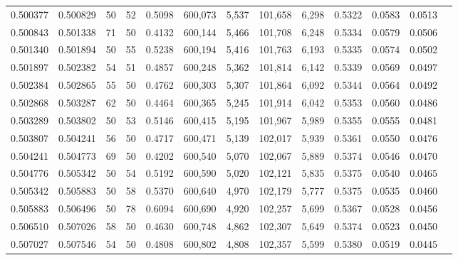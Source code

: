 \begin{tabular}{rrrrrrrrrrrrr}
0.500377 & 0.500829 &    50 &  52 &                                     0.5098 & 600,073 &   5,537 & 101,658 &   6,298 & 0.5322 & 0.0583 & 0.0513 \\
0.500843 & 0.501338 &    71 &  50 &                                     0.4132 & 600,144 &   5,466 & 101,708 &   6,248 & 0.5334 & 0.0579 & 0.0506 \\
0.501340 & 0.501894 &    50 &  55 &                                     0.5238 & 600,194 &   5,416 & 101,763 &   6,193 & 0.5335 & 0.0574 & 0.0502 \\
0.501897 & 0.502382 &    54 &  51 &                                     0.4857 & 600,248 &   5,362 & 101,814 &   6,142 & 0.5339 & 0.0569 & 0.0497 \\
0.502384 & 0.502865 &    55 &  50 &                                     0.4762 & 600,303 &   5,307 & 101,864 &   6,092 & 0.5344 & 0.0564 & 0.0492 \\
0.502868 & 0.503287 &    62 &  50 &                                     0.4464 & 600,365 &   5,245 & 101,914 &   6,042 & 0.5353 & 0.0560 & 0.0486 \\
0.503289 & 0.503802 &    50 &  53 &                                     0.5146 & 600,415 &   5,195 & 101,967 &   5,989 & 0.5355 & 0.0555 & 0.0481 \\
0.503807 & 0.504241 &    56 &  50 &                                     0.4717 & 600,471 &   5,139 & 102,017 &   5,939 & 0.5361 & 0.0550 & 0.0476 \\
0.504241 & 0.504773 &    69 &  50 &                                     0.4202 & 600,540 &   5,070 & 102,067 &   5,889 & 0.5374 & 0.0546 & 0.0470 \\
0.504776 & 0.505342 &    50 &  54 &                                     0.5192 & 600,590 &   5,020 & 102,121 &   5,835 & 0.5375 & 0.0540 & 0.0465 \\
0.505342 & 0.505883 &    50 &  58 &                                     0.5370 & 600,640 &   4,970 & 102,179 &   5,777 & 0.5375 & 0.0535 & 0.0460 \\
0.505883 & 0.506496 &    50 &  78 &                                     0.6094 & 600,690 &   4,920 & 102,257 &   5,699 & 0.5367 & 0.0528 & 0.0456 \\
0.506510 & 0.507026 &    58 &  50 &                                     0.4630 & 600,748 &   4,862 & 102,307 &   5,649 & 0.5374 & 0.0523 & 0.0450 \\
0.507027 & 0.507546 &    54 &  50 &                                     0.4808 & 600,802 &   4,808 & 102,357 &   5,599 & 0.5380 & 0.0519 & 0.0445 \\

\end{tabular}
